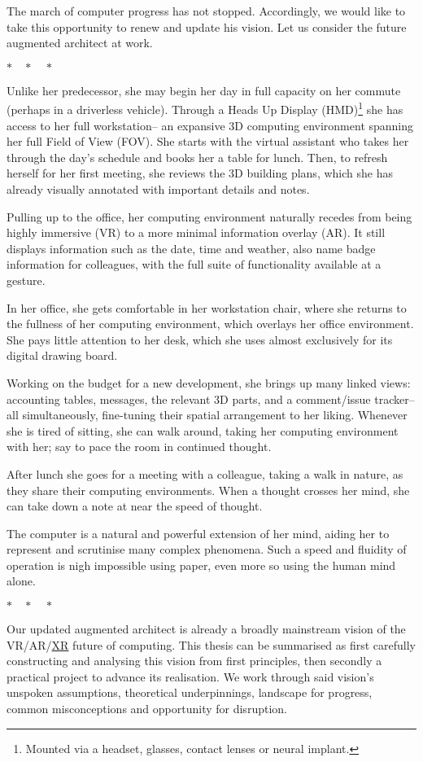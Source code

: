 \documentclass[logo,bsc,singlespacing,parskip]{infthesis}
\newcommand{\threestars}{\begin{center}$ {\ast}\quad{\ast}\quad{\ast} $\end{center}}
\begin{document}
The march of computer progress has not stopped.
Accordingly, we would like to take this opportunity to renew and update his vision.
Let us consider the future augmented architect at work.
\threestars

Unlike her predecessor, she may begin her day in full capacity on her commute (perhaps in a driverless vehicle).
Through a Heads Up Display (HMD)\footnote{Mounted via a headset, glasses, contact lenses or neural implant.} she has access to her full workstation-- an expansive 3D computing environment spanning her full Field of View (FOV).
She starts with the virtual assistant who takes her through the day's schedule and books her a table for lunch.
Then, to refresh herself for her first meeting, she reviews the 3D building plans, which she has already visually annotated with important details and notes.

Pulling up to the office, her computing environment naturally recedes from being highly immersive (VR) to a more minimal information overlay (AR).
It still displays information such as the date, time and weather, also name badge information for colleagues, with the full suite of functionality available at a gesture.

In her office, she gets comfortable in her workstation chair, where she returns to the fullness of her computing environment, which overlays her office environment.
She pays little attention to her desk, which she uses almost exclusively for its digital drawing board.

Working on the budget for a new development, she brings up many linked views: accounting tables, messages, the relevant 3D parts, and a comment/issue tracker-- all simultaneously, fine-tuning their spatial arrangement to her liking.
Whenever she is tired of sitting, she can walk around, taking her computing environment with her; say to pace the room in continued thought.

After lunch she goes for a meeting with a colleague, taking a walk in nature, as they share their computing environments.
When a thought crosses her mind, she can take down a note at near the speed of thought.

The computer is a natural and powerful extension of her mind, aiding her to represent and scrutinise many complex phenomena.
Such a speed and fluidity of operation is nigh impossible using paper, even more so using the human mind alone.

\threestars
Our updated augmented architect is already a broadly mainstream vision of the VR/AR/\hyperref[org88b0f70]{XR} future of computing.
This thesis can be summarised as first carefully constructing and analysing this vision from first principles, then secondly a practical project to advance its realisation.
We work through said vision's unspoken assumptions, theoretical underpinnings, landscape for progress, common misconceptions and opportunity for disruption.
\end{document}
